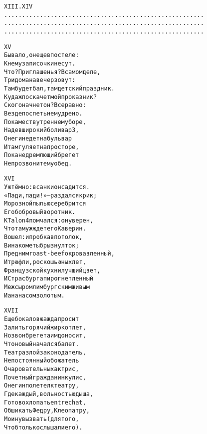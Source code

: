 \begin{minipage}[t]{\dimexpr 0.5\textwidth -\tabcolsep-.5pt}
\begin{alltt}\normalfont\centering
XIII. XIV
 ........................................................
 ........................................................
 ........................................................
\end{alltt}
\end{minipage}
\vspace{4in}
\clearpage


\begin{minipage}[t]{\dimexpr 0.5\textwidth -\tabcolsep-.5pt}
\begin{alltt}\normalfont\centering
XV
Бывало, он еще в постеле:
К нему записочки несут.
Что? Приглашенья? В самом деле,
Три дома на вечер зовут:
Там будет бал, там детский праздник.
Куда ж поскачет мой проказник?
С кого начнет он? Все равно:
Везде поспеть немудрено.
Покамест в утреннем уборе,
Надев широкий боливар 3,
Онегин едет на бульвар
И там гуляет на просторе,
Пока недремлющий брегет
Не прозвонит ему обед.
\end{alltt}
\end{minipage}

\begin{minipage}[t]{\dimexpr 0.5\textwidth -\tabcolsep-.5pt}
\begin{alltt}\normalfont\centering
XVI
Уж тёмно: в санки он садится.
«Пади, пади!» — раздался крик;
Морозной пылью серебрится
Его бобровый воротник.
К Talon 4 помчался: он уверен,
Что там уж ждет его Каверин.
Вошел: и пробка в потолок,
Вина кометы брызнул ток;
Пред ним roast-beef окровавленный,
И трюфли, роскошь юных лет,
Французской кухни лучший цвет,
И Страсбурга пирог нетленный
Меж сыром лимбургским живым
И ананасом золотым.
\end{alltt}
\end{minipage}
\clearpage

\begin{minipage}[t]{\dimexpr 0.5\textwidth -\tabcolsep-.5pt}
\begin{alltt}\normalfont\centering
XVII
Еще бокалов жажда просит
Залить горячий жир котлет,
Но звон брегета им доносит,
Что новый начался балет.
Театра злой законодатель,
Непостоянный обожатель
Очаровательных актрис,
Почетный гражданин кулис,
Онегин полетел к театру,
Где каждый, вольностью дыша,
Готов охлопать entrechat,
Обшикать Федру, Клеопатру,
Моину вызвать (для того,
Чтоб только слышали его).
\end{alltt}
\end{minipage}

